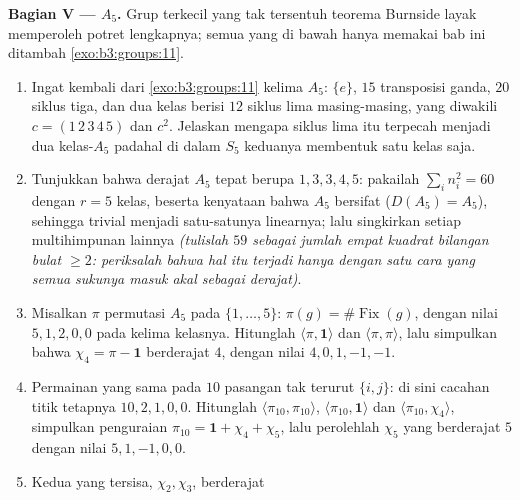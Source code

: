 \begin{problem}
\medskip
\noindent\textbf{Bagian V ---  $A_5$.} Grup
terkecil yang tak tersentuh teorema Burnside layak memperoleh potret
lengkapnya; semua yang di bawah hanya memakai bab ini ditambah
\cref{exo:b3:groups:11}.
\begin{enumerate}[resume]
  \item Ingat kembali dari \cref{exo:b3:groups:11} kelima 
        $A_5$: $\{e\}$, $15$ transposisi
        ganda, $20$ siklus tiga, dan dua kelas
        berisi $12$ siklus lima masing-masing, yang diwakili $c =
        (1\,2\,3\,4\,5)$ dan $c^2$. Jelaskan mengapa siklus lima itu
        terpecah menjadi dua kelas-$A_5$ padahal di dalam $S_5$
        keduanya membentuk satu kelas saja.
  \item Tunjukkan bahwa derajat  $A_5$ tepat berupa
        $1, 3, 3, 4, 5$: pakailah $\sum_in_i^2 = 60$ dengan $r = 5$
        kelas, beserta kenyataan bahwa $A_5$ bersifat  ($D(A_5) =
        A_5$), sehingga  trivial menjadi satu-satunya  linearnya;
        lalu singkirkan setiap multihimpunan lainnya \emph{(tulislah $59$
        sebagai jumlah empat kuadrat bilangan bulat $\geq 2$: periksalah bahwa
        hal itu terjadi hanya dengan satu cara yang semua sukunya masuk akal
        sebagai derajat)}.
  \item Misalkan $\pi$  permutasi $A_5$ pada
        $\{1, \dots, 5\}$: $\pi(g) = \#\operatorname{Fix}(g)$,
        dengan nilai $5, 1, 2, 0, 0$ pada kelima kelasnya. Hitunglah
        $\langle\pi, \mathbf 1\rangle$ dan $\langle\pi,
        \pi\rangle$, lalu simpulkan bahwa $\chi_4 = \pi - \mathbf 1$
         berderajat $4$, dengan nilai $4, 0, 1, -1,
        -1$.
  \item Permainan yang sama pada $10$ pasangan tak terurut $\{i, j\}$: di sini
        cacahan titik tetapnya $10, 2, 1, 0, 0$. Hitunglah
        $\langle\pi_{10}, \pi_{10}\rangle$, $\langle\pi_{10},
        \mathbf 1\rangle$ dan $\langle\pi_{10}, \chi_4\rangle$,
        simpulkan penguraian $\pi_{10} = \mathbf 1 + \chi_4
        + \chi_5$, lalu perolehlah $\chi_5$ yang  berderajat
        $5$ dengan nilai $5, 1, -1, 0, 0$.
  \item Kedua  yang tersisa, $\chi_2, \chi_3$, berderajat

\end{enumerate}
\end{problem}
